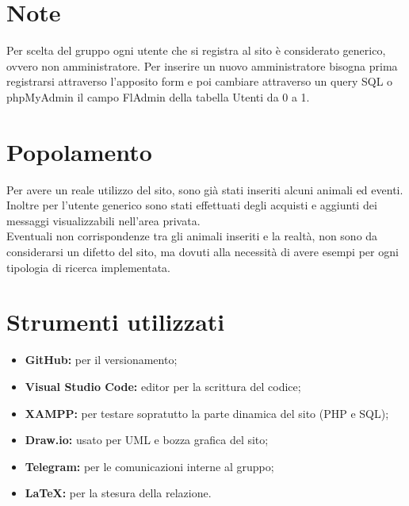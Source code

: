 \appendix
    \section{Note}
    Per scelta del gruppo ogni utente che si registra al sito è considerato generico, ovvero non amministratore. Per inserire un nuovo amministratore bisogna prima registrarsi attraverso l'apposito form e poi cambiare attraverso un query SQL o phpMyAdmin il campo FlAdmin della tabella Utenti da 0 a 1.

    \section{Popolamento}
    Per avere un reale utilizzo del sito, sono già stati inseriti alcuni animali ed eventi. Inoltre per l'utente generico sono stati effettuati degli acquisti e aggiunti dei messaggi visualizzabili nell'area privata.\\
    Eventuali non corrispondenze tra gli animali inseriti e la realtà, non sono da considerarsi un difetto del sito, ma dovuti alla necessità di avere esempi per ogni tipologia di ricerca implementata.

    \section{Strumenti utilizzati}
    \begin{itemize}
        \item \textbf{GitHub:} per il versionamento; 
        \item \textbf{Visual Studio Code:} editor per la scrittura del codice; 
        \item \textbf{XAMPP:} per testare sopratutto la parte dinamica del sito (PHP e SQL);
        \item \textbf{Draw.io:} usato per UML e bozza grafica del sito;
        \item \textbf{Telegram:} per le comunicazioni interne al gruppo;
        \item \textbf{\LaTeX:} per la stesura della relazione.
    \end{itemize}
\pagebreak
